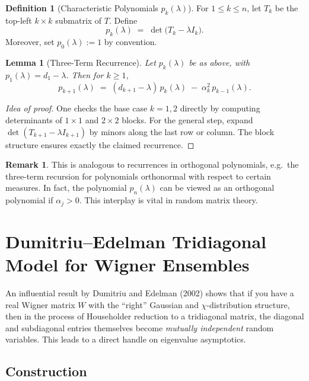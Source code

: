 \documentclass[letterpaper,11pt,oneside,reqno]{article}
\numberwithin{equation}{section}
\newtheorem{lemma}[proposition]{Lemma}
\theoremstyle{definition}
\newtheorem{definition}[proposition]{Definition}
\newtheorem{remark}[proposition]{Remark}
\begin{document}
\begin{definition}[Characteristic Polynomials $p_k(\lambda)$]
For $1 \le k \le n$, let $T_k$ be the top-left $k \times k$ submatrix of $T$. Define
\[
  p_k(\lambda) \;=\; \det\bigl(T_k - \lambda I_k\bigr).
\]
Moreover, set $p_0(\lambda):=1$ by convention.
\end{definition}

\begin{lemma}[Three-Term Recurrence]
\label{lem:3term-recurrence}
Let $p_k(\lambda)$ be as above, with $p_1(\lambda) = d_1 - \lambda$. Then for $k \ge 1$,
\[
  p_{k+1}(\lambda)
  \;=\;
  (d_{k+1} - \lambda)\,p_k(\lambda)
  \;-\;\alpha_k^2\,p_{k-1}(\lambda).
\]
\end{lemma}

\begin{proof}[Idea of proof]
One checks the base case $k=1,2$ directly by computing determinants of $1\times1$ and $2\times2$ blocks. For the general step, expand $\det(T_{k+1}-\lambda I_{k+1})$ by minors along the last row or column. The block structure ensures exactly the claimed recurrence.
\end{proof}

\begin{remark}
This is analogous to recurrences in orthogonal polynomials, e.g.\ the three-term recursion for polynomials orthonormal with respect to certain measures. In fact, the polynomial $p_n(\lambda)$ can be viewed as an orthogonal polynomial if $\alpha_j>0$. This interplay is vital in random matrix theory.
\end{remark}

\section{Dumitriu--Edelman Tridiagonal Model for Wigner Ensembles}
\label{sec:dumitriu-edelman}

An influential result by Dumitriu and Edelman (2002) shows that if you have a real Wigner matrix $W$ with the “right” Gaussian and $\chi$-distribution structure, then in the process of Householder reduction to a tridiagonal matrix, the diagonal and subdiagonal entries themselves become \emph{mutually independent} random variables. This leads to a direct handle on eigenvalue asymptotics.

\subsection{Construction}
\end{document}
